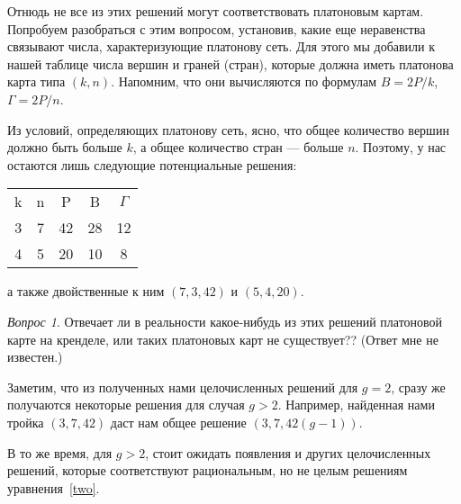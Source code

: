 \documentclass[12pt, a4paper, openany]{amsart}
\theoremstyle{plain}
\theoremstyle{definition}
\theoremstyle{remark}
\newtheorem{que}[theorem]{Вопрос}
\begin{document}
Отнюдь не все из этих решений могут соответствовать платоновым картам.
Попробуем разобраться с этим вопросом, установив, какие еще неравенства связывают
числа, характеризующие платонову сеть. Для этого мы добавили к нашей таблице числа вершин и граней (стран), которые должна иметь платонова карта типа $(k,n)$. Напомним, что они вычисляются по формулам $B=2P/k$, $\Gamma=2P/n$.



Из условий, определяющих платонову сеть, ясно, что общее количество вершин должно быть больше $k$, а общее количество стран --- больше $n$. Поэтому, у нас остаются лишь следующие потенциальные решения:


\begin{tabular}{ccc|cc}
	k&n&P&B&$\Gamma$\\	
	3&7&42&28&12\\
	4&5&20&10&8\\			
\end{tabular}

а также двойственные к ним $(7,3,42)$ и $(5,4,20)$.

\begin{que}
	Отвечает ли в реальности какое-нибудь из этих решений платоновой карте на кренделе, или таких платоновых карт не существует?? (Ответ мне не известен.) 
\end{que}

Заметим, что из полученных нами целочисленных решений для $g=2$, сразу же получаются некоторые решения для случая $g>2$. Например, найденная нами тройка
$(3,7,42)$ даст нам общее решение $(3,7,42(g-1))$. 

В то же время, для $g>2$, стоит ожидать появления и других целочисленных решений,
которые соответствуют рациональным, но не целым решениям уравнения~\ref{two}. 

 
 
	
	
\end{document}
